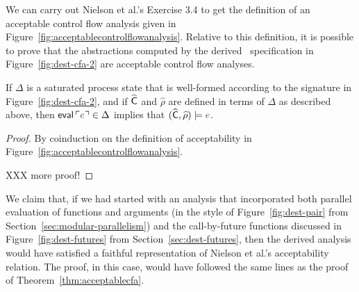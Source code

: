 We can carry out Nielson et al.'s Exercise 3.4 to get the definition
of an acceptable control flow analysis given in
Figure~\ref{fig:acceptablecontrolflowanalysis}. Relative to this
definition, it is possible to prove that the abstractions computed by
the derived \sls~specification in Figure~\ref{fig:dest-cfa-2} are
acceptable control flow analyses.

\bigskip
\begin{theorem}\label{thm:acceptablecfa}
If $\Delta$ is a saturated process state that is well-formed according to
the signature in Figure~\ref{fig:dest-cfa-2}, and if $\widehat{\sf C}$
and $\widehat{\rho}$ are defined in terms of $\Delta$ as described above,
then ${\sf eval}\,\interp{e} \in \Delta$ implies
that $(\widehat{\sf C}, \widehat{\rho}) \models \obj{e}$. 
\end{theorem}

\begin{proof}
  By coinduction on the definition of acceptability in
  Figure~\ref{fig:acceptablecontrolflowanalysis}. 
  
  XXX more proof!
\end{proof}

We claim that, if we had started with an analysis that incorporated
both parallel evaluation of functions and arguments (in the style of
Figure~\ref{fig:dest-pair} from Section~\ref{sec:modular-parallelism})
and the call-by-future functions discussed in
Figure~\ref{fig:dest-futures} from Section~\ref{sec:dest-futures},
then the derived analysis would have satisfied a faithful
representation of Nielson et al.'s acceptability relation. The proof,
in this case, would have followed the same lines as the proof of
Theorem~\ref{thm:acceptablecfa}.




